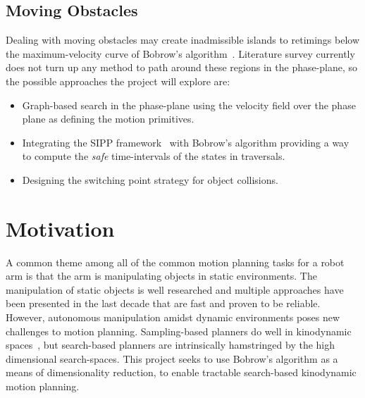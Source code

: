 \documentclass[letterpaper,10pt]{article} %
\begin{document}
\subsection{Moving Obstacles}\label{subsec:movobs}
Dealing with moving obstacles may create inadmissible islands to retimings below the maximum-velocity curve of Bobrow's algorithm~\cite{shin1985minimum}. Literature survey currently does not turn up any method to path around these regions in the phase-plane, so the possible approaches the project will explore are:

\begin{itemize}
\item Graph-based search in the phase-plane using the velocity field over the phase plane as defining the motion primitives.
\item Integrating the SIPP framework~\cite{phillips2011sipp} with Bobrow's algorithm providing a way to compute the \emph{safe} time-intervals of the states in traversals.
\item Designing the switching point strategy for object collisions.
\end{itemize}


\section{Motivation}

A common theme among all of the common motion planning tasks for a robot arm is that the arm is manipulating objects in static environments. The manipulation of static objects is well researched and multiple approaches have been presented in the last decade  that are fast and proven to be reliable. However, autonomous manipulation amidst dynamic environments poses new challenges to motion planning. Sampling-based planners do well in kinodynamic spaces~\cite{lavalle2001randomized}, but search-based planners are intrinsically hamstringed by the high dimensional search-spaces. This project seeks to use Bobrow's algorithm as a means of dimensionality reduction, to enable tractable search-based kinodynamic motion planning.






\end{document}
